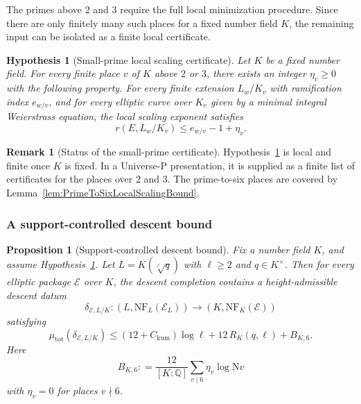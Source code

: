 \documentclass[10pt, reqno]{amsart}
\theoremstyle{plain}
\newtheorem{proposition}[theorem]{Proposition}
\theoremstyle{definition}
\newtheorem{remark}[theorem]{Remark}
\theoremstyle{plain}
\newtheorem{hypothesis}[theorem]{Hypothesis}
\newcommand{\Q}{\mathbb{Q}}
\newcommand{\coloneqq}{\mathrel{\mathop:}=}
\begin{document}
The primes above $2$ and $3$ require the full local minimization procedure. Since there are only finitely many such places for a fixed number field $K$, the remaining input can be isolated as a finite local certificate.

\begin{hypothesis}[Small-prime local scaling certificate]\label{hyp:SmallPrimeLocalScalingCertificate}
Let $K$ be a fixed number field. For every finite place $v$ of $K$ above $2$ or $3$, there exists an integer $\eta_{v}\ge 0$ with the following property. For every finite extension $L_{w}/K_{v}$ with ramification index $e_{w/v}$, and for every elliptic curve over $K_{v}$ given by a minimal integral Weierstrass equation, the local scaling exponent satisfies
\[
  r(E,L_{w}/K_{v})
  \le
  e_{w/v}-1+\eta_{v}.
\]
\end{hypothesis}

\begin{remark}[Status of the small-prime certificate]\label{rem:SmallPrimeCertificateStatus}
Hypothesis~\ref{hyp:SmallPrimeLocalScalingCertificate} is local and finite once $K$ is fixed. In a Universe-P presentation, it is supplied as a finite list of certificates for the places over $2$ and $3$. The prime-to-six places are covered by Lemma~\ref{lem:PrimeToSixLocalScalingBound}.
\end{remark}

\subsubsection{A support-controlled descent bound}\label{subsubsec:SupportControlledDescentTheorem}

\begin{proposition}[Support-controlled descent bound]\label{prop:SupportControlledDescentBound}
Fix a number field $K$, and assume Hypothesis~\ref{hyp:SmallPrimeLocalScalingCertificate}. Let $L=K(\sqrt[\ell]{q})$ with $\ell\ge 2$ and $q\in K^{\times}$. Then for every elliptic package $\mathcal{E}$ over $K$, the descent completion contains a height-admissible descent datum
\[
  \delta_{\mathcal{E},L/K}
  \colon
  (L,\mathrm{NF}_{L}(\mathcal{E}_{L}))
  \longrightarrow
  (K,\mathrm{NF}_{K}(\mathcal{E}))
\]
satisfying
\[
  \mu_{\mathrm{tot}}(\delta_{\mathcal{E},L/K})
  \le
  (12+C_{\mathrm{kum}})\log \ell
  +
  12\,R_{K}(q,\ell)
  +
  B_{K,6}.
\]
Here
\[
  B_{K,6}
  \coloneqq
  \frac{12}{[K:\Q]}
  \sum_{v\mid 6}
  \eta_{v}\log \mathrm{N}v
\]
with $\eta_{v}=0$ for places $v\nmid 6$.
\end{proposition}
\end{document}
